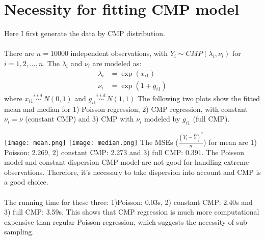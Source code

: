 \documentclass[]{article}
\begin{document}
\section{Necessity for fitting CMP model}
Here I first generate the data by CMP distribution.\\
\\
There are $n = 10000$ independent observations, with $Y_i \sim CMP(\lambda_i, \nu_i)$ for $i = 1, 2,..., n$. The $\lambda_i$ and $\nu_i$ are modeled as:
\begin{align*}
	\lambda_i &= \exp(x_{i1})\\
	\nu_i &= \exp(1 + g_{i1})
\end{align*}
where $x_{i1} \stackrel{i.i.d.}{\sim} N(0, 1)$ and $g_{i1} \stackrel{i.i.d.}{\sim} N(1, 1)$ The following two plots show the fitted mean and median for 1) Poisson regression, 2) CMP regression, with constant $\nu_i = \nu$ (constant CMP) and 3) CMP with $\nu_i$ modeled by $g_{i1}$ (full CMP).\\
\graphicspath{{D:/GitHub/sub-sampling/COM-Poisson/cdoe/}}
\texttt{[image: mean.png]}
\texttt{[image: median.png]}
The MSEs ($\frac{(Y_i - \hat{Y})^2}{n}$) for mean are 1) Poisson: 2.269, 2) constant CMP: 2.273 and 3) full CMP: 0.391. The Poisson model and constant dispersion CMP model are not good for handling extreme observations. Therefore, it's necessary to take dispersion into account and CMP is a good choice.\\
\\
The running time for these three: 1)Poisson: 0.03s, 2) constant CMP: 2.40s and 3) full CMP: 3.59s. This shows that CMP regression is much more computational expensive than regular Poisson regression, which suggests the necessity of sub-sampling.
\end{document}
